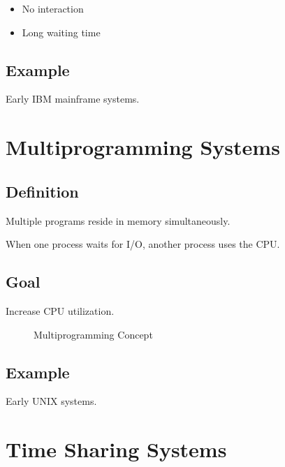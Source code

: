 \begin{itemize}
\item No interaction
\item Long waiting time
\end{itemize}

\subsection{Example}

Early IBM mainframe systems.

\section{Multiprogramming Systems}

\subsection{Definition}

Multiple programs reside in memory simultaneously.

When one process waits for I/O, another process uses the CPU.

\subsection{Goal}

Increase CPU utilization.

\begin{figure}[H]
\centering
{}
\caption{Multiprogramming Concept}
\end{figure}

\subsection{Example}

Early UNIX systems.

\section{Time Sharing Systems}

